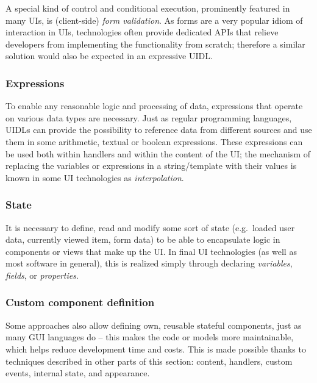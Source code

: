A special kind of control and conditional execution, prominently featured in many UIs, is (client-side) \emph{form validation}.
As forms are a very popular idiom of interaction in UIs, technologies often provide dedicated APIs that relieve developers from implementing the functionality from scratch;
therefore a similar solution would also be expected in an expressive UIDL\@.

\subsubsection{Expressions}
To enable any reasonable logic and processing of data, expressions that operate on various data types are necessary.
Just as regular programming languages, UIDLs can provide the possibility to reference data from different sources and use them in some arithmetic, textual or boolean expressions.
These expressions can be used both within handlers and within the content of the UI;
the mechanism of replacing the variables or expressions in a string/template with their values is known in some UI technologies as \emph{interpolation}.

\subsubsection{State}
It is necessary to define, read and modify some sort of state (e.g.\ loaded user data, currently viewed item, form data) to be able to encapsulate logic in components or views that make up the UI\@.
In final UI technologies (as well as most software in general), this is realized simply through declaring \emph{variables}, \emph{fields}, or \emph{properties}.

\subsubsection{Custom component definition}
Some approaches also allow defining own, reusable stateful components, just as many GUI languages do -- this makes the code or models more maintainable, which helps reduce development time and costs.
This is made possible thanks to techniques described in other parts of this section: content, handlers, custom events, internal state, and appearance.

